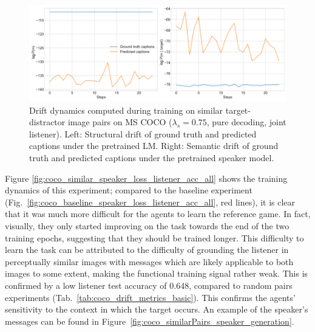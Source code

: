 \begin{figure}[h]
	\centering
	\includegraphics[width=\linewidth]{images/coco_structural_semantic_drift_4000_pure_075_similarFixed.png}
	\caption{Drift dynamics computed during training on similar target-distractor image pairs on MS COCO ($\lambda_s=0.75$, pure decoding, joint listener). Left: Structural drift of ground truth and predicted captions under the pretrained LM. Right: Semantic drift of ground truth and predicted captions under the pretrained speaker model.}
	\label{fig:coco_similar_str_sem_drift_all}
\end{figure}

Figure \ref{fig:coco_similar_speaker_loss_listener_acc_all} shows the training dynamics of this experiment; compared to the baseline experiment (Fig.~\ref{fig:coco_baseline_speaker_loss_listener_acc_all}, red lines), it is clear that it was much more difficult for the agents to learn the reference game. In fact, visually, they only started improving on the task towards the end of the two training epochs, suggesting that they should be trained longer. This difficulty to learn the task can be attributed to the difficulty of grounding the listener in perceptually similar images with messages which are likely applicable to both images to some extent, making the functional training signal rather weak. This is confirmed by a low listener test accuracy of 0.648, compared to random pairs experiments (Tab.~\ref{tab:coco_drift_metrics_basic}). This confirms the agents' sensitivity to the context in which the target occurs. An example of the speaker's messages can be found in Figure~\ref{fig:coco_similarPairs_speaker_generation}.

